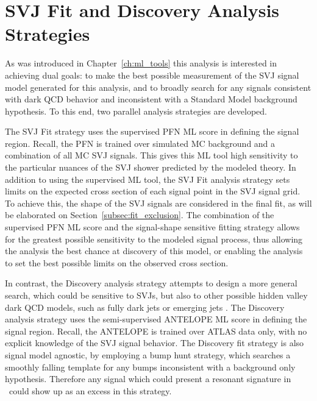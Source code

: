 

\section{SVJ Fit and Discovery Analysis Strategies}
\label{sec:strategies}
As was introduced in Chapter~\ref{ch:ml_tools} this analysis is interested in achieving dual goals: to make the best possible measurement of the SVJ signal model generated for this analysis, and to broadly search for any signals consistent with dark QCD behavior and inconsistent with a Standard Model background hypothesis. To this end, two parallel analysis strategies are developed.\par

The SVJ Fit strategy uses the supervised PFN ML score in defining the signal region. Recall, the PFN is trained over simulated MC background and a combination of all MC SVJ signals. This gives this ML tool high sensitivity to the particular nuances of the SVJ shower predicted by the modeled theory. In addition to using the supervised ML tool, the SVJ Fit analysis strategy sets limits on the expected cross section of each signal point in the SVJ signal grid. To achieve this, the shape of the SVJ signals are considered in the final fit, as will be elaborated on Section~\ref{subsec:fit_exclusion}. The combination of the supervised PFN ML score and the signal-shape sensitive fitting strategy allows for the greatest possible sensitivity to the modeled signal process, thus allowing the analysis the best chance at discovery of this model, or enabling the analysis to set the best possible limits on the observed cross section.\par

In contrast, the Discovery analysis strategy attempts to design a more general search, which could be sensitive to SVJs, but also to other possible hidden valley dark QCD models, such as fully dark jets or emerging jets \cite{snowmass}. The Discovery analysis strategy uses the semi-supervised ANTELOPE ML score in defining the signal region. Recall, the ANTELOPE is trained over ATLAS data only, with no explicit knowledge of the SVJ signal behavior. The Discovery fit strategy is also signal model agnostic, by employing a bump hunt \cite{bumphunt} strategy, which searches a smoothly falling template for any bumps inconsistent with a background only hypothesis. Therefore any signal which could present a resonant signature in \mt~could show up as an excess in this strategy. \par

